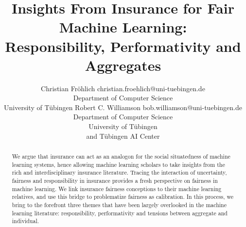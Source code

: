 \documentclass[11pt]{article} %
\title{Insights From Insurance for Fair Machine Learning:\\ Responsibility, Performativity and Aggregates}
\author{\name Christian Fröhlich \email christian.froehlich@uni-tuebingen.de \\
      \addr Department of Computer Science\\
      University of Tübingen
      \AND
      \name Robert C. Williamson \email bob.williamson@uni-tuebingen.de \\
      \addr Department of Computer Science\\
      University of Tübingen\\ 
      and Tübingen AI Center
      }
\begin{document}
\maketitle

\begin{abstract}
We argue that insurance can act as an analogon for the social situatedness of machine learning systems, hence allowing machine learning scholars to take insights from the rich and interdisciplinary insurance literature. Tracing the interaction of uncertainty, fairness and responsibility in insurance provides a fresh perspective on fairness in machine learning. We link insurance fairness conceptions to their machine learning relatives, and use this bridge to problematize fairness as calibration. 
In this process, we bring to the forefront three themes that have been largely overlooked in the machine learning literature: 
responsibility, performativity and tensions between aggregate and individual.

\end{abstract}
\end{document}
